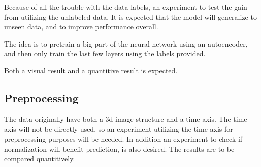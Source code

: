 Because of all the trouble with the data labels, an experiment to test the gain from utilizing the unlabeled data.
It is expected that the model will generalize to unseen data, and to improve performance overall.

The idea is to pretrain a big part of the neural network using an autoencoder, and then only train the last few layers using the labels provided.

Both a visual result and a quantitive result is expected.

\subsection{Preprocessing} %
\label{sub:preprocessing}
The data originally have both a 3d image structure and a time axis.
The time axis will not be directly used, so an experiment utilizing the time axis for preprocessing purposes will be needed.
In addition an experiment to check if normalization will benefit prediction, is also desired.
The results are to be compared quantitively.
